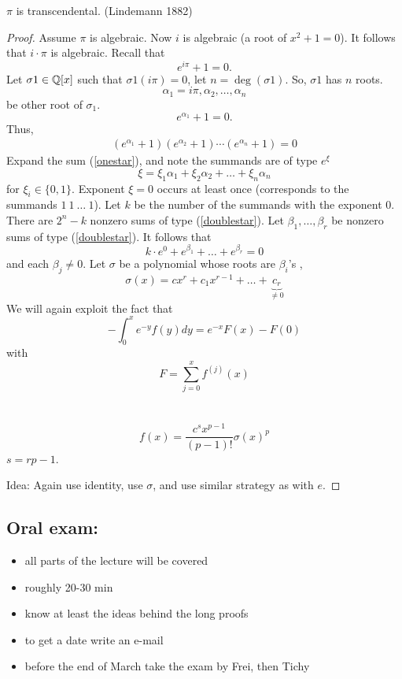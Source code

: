 \documentclass[NumTh.tex]{subfiles}
\begin{document}
\begin{theorem}
  $\pi$ is transcendental. (Lindemann 1882)
\end{theorem}

\begin{proof}
  Assume $\pi$ is algebraic.
  Now $i$ is algebraic (a root of $x^2+1 = 0$).
  It follows that $i \cdot \pi$ is algebraic.
  Recall that
  \[ e^{i \pi} +1 = 0 \text{.} \]
  Let $\sigma1 \in \mathbb{Q}[x]$ such that $\sigma1(i \pi) = 0$,
  let $n = \deg(\sigma1)$.
  So, $\sigma1$ has $n$ roots.
  \[ \alpha_1 = i \pi, \alpha_2,\dots,\alpha_n \]
  be other root of $\sigma_1$.
  \[ e^{\alpha_1} + 1 = 0 \text{.} \]
  Thus,
  \begin{align}\label{onestar}
    (e^{\alpha_1} + 1)(e^{\alpha_2} + 1) \cdots (e^{\alpha_n} + 1) = 0
  \end{align}
  Expand the sum (\ref{onestar}), and note the summands are of type $e^\xi$
  \[ \xi = \xi_1 \alpha_1 + \xi_2 \alpha_2 + \dots + \xi_n \alpha_n \]
  for $\xi_i \in \{0,1\}$.
  Exponent $\xi = 0$ occurs at least once (corresponds to the summands $1 \: 1 \: \dots \: 1$).
  Let $k$ be the number of the summands with the exponent $0$.
  There are $2^n-k$ nonzero sums of type (\ref{doublestar}).
  Let $\beta_1,\dots,\beta_r$ be nonzero sums of type (\ref{doublestar}).
  It follows that 
  \[ k \cdot e^0 + e^{\beta_1} + \dots + e^{\beta_r} = 0 \]
  and each $\beta_j \neq 0$.
  Let $\sigma$ be a polynomial whose roots are $\beta_i$'s ,
  \[ \sigma(x) = c x^r + c_1 x^{r-1} + \dots + \underbrace{c_r}_{\neq 0} \]
  We will again exploit the fact that 
  \[ - \int_0^x e^{-y} f(y) dy = e^{-x} F(x) - F(0) \]
  with
  \[ F = \sum_{j=0}^x f^{(j)}(x) \]
  \\
  \\
  \[ f(x) = \frac{c^s x^{p-1}}{(p-1)!} \sigma(x)^p \]
  $s = rp -1$.
  
  Idea: Again use identity, use $\sigma$, and use similar strategy as with $e$.
\end{proof}

\subsection*{Oral exam:}

\begin{itemize}
  \item all parts of the lecture will be covered
  \item roughly 20-30 min 
  \item know at least the ideas behind the long proofs
  \item to get a date write an e-mail
  \item before the end of March take the exam by Frei, then Tichy
\end{itemize}
\end{document}
